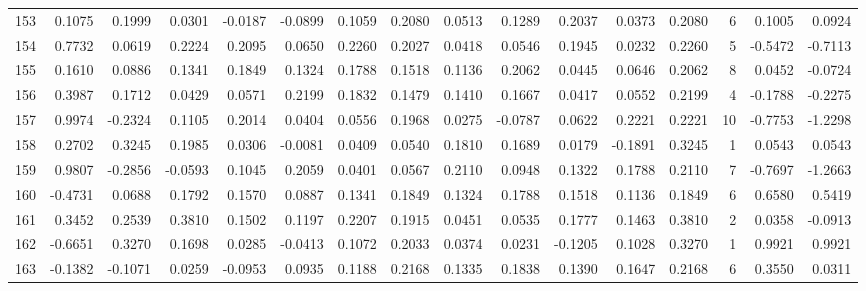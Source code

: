 \begin{tabular}{lrrrrrrrrrrrrrrr}
153 &      0.1075 &  0.1999 &  0.0301 & -0.0187 & -0.0899 &  0.1059 &  0.2080 &  0.0513 &  0.1289 &  0.2037 &   0.0373 &     0.2080 &      6 &                    0.1005 &                     0.0924 \\
154 &      0.7732 &  0.0619 &  0.2224 &  0.2095 &  0.0650 &  0.2260 &  0.2027 &  0.0418 &  0.0546 &  0.1945 &   0.0232 &     0.2260 &      5 &                   -0.5472 &                    -0.7113 \\
155 &      0.1610 &  0.0886 &  0.1341 &  0.1849 &  0.1324 &  0.1788 &  0.1518 &  0.1136 &  0.2062 &  0.0445 &   0.0646 &     0.2062 &      8 &                    0.0452 &                    -0.0724 \\
156 &      0.3987 &  0.1712 &  0.0429 &  0.0571 &  0.2199 &  0.1832 &  0.1479 &  0.1410 &  0.1667 &  0.0417 &   0.0552 &     0.2199 &      4 &                   -0.1788 &                    -0.2275 \\
157 &      0.9974 & -0.2324 &  0.1105 &  0.2014 &  0.0404 &  0.0556 &  0.1968 &  0.0275 & -0.0787 &  0.0622 &   0.2221 &     0.2221 &     10 &                   -0.7753 &                    -1.2298 \\
158 &      0.2702 &  0.3245 &  0.1985 &  0.0306 & -0.0081 &  0.0409 &  0.0540 &  0.1810 &  0.1689 &  0.0179 &  -0.1891 &     0.3245 &      1 &                    0.0543 &                     0.0543 \\
159 &      0.9807 & -0.2856 & -0.0593 &  0.1045 &  0.2059 &  0.0401 &  0.0567 &  0.2110 &  0.0948 &  0.1322 &   0.1788 &     0.2110 &      7 &                   -0.7697 &                    -1.2663 \\
160 &     -0.4731 &  0.0688 &  0.1792 &  0.1570 &  0.0887 &  0.1341 &  0.1849 &  0.1324 &  0.1788 &  0.1518 &   0.1136 &     0.1849 &      6 &                    0.6580 &                     0.5419 \\
161 &      0.3452 &  0.2539 &  0.3810 &  0.1502 &  0.1197 &  0.2207 &  0.1915 &  0.0451 &  0.0535 &  0.1777 &   0.1463 &     0.3810 &      2 &                    0.0358 &                    -0.0913 \\
162 &     -0.6651 &  0.3270 &  0.1698 &  0.0285 & -0.0413 &  0.1072 &  0.2033 &  0.0374 &  0.0231 & -0.1205 &   0.1028 &     0.3270 &      1 &                    0.9921 &                     0.9921 \\
163 &     -0.1382 & -0.1071 &  0.0259 & -0.0953 &  0.0935 &  0.1188 &  0.2168 &  0.1335 &  0.1838 &  0.1390 &   0.1647 &     0.2168 &      6 &                    0.3550 &                     0.0311 \\

\end{tabular}
